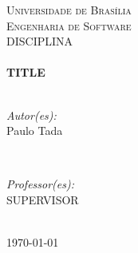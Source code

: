 \begin{titlepage}

\center %
 

\textsc{\LARGE Universidade de Brasília}\\[1.5cm]	%
\textsc{\Large Engenharia de Software}\\[0.5cm]		%
\textsc{\large DISCIPLINA}\\[0.5cm]		%


\HRule \\[0.4cm]
{ \huge \bfseries TITLE}\\[0.4cm] %
\HRule \\[1.5cm]
 

\begin{minipage}{0.4\textwidth}
\begin{flushleft} \large
\emph{Autor(es):}\\
Paulo Tada %
\end{flushleft}
\end{minipage}
~
\begin{minipage}{0.4\textwidth}
\begin{flushright} \large
\emph{Professor(es):} \\
SUPERVISOR %
\end{flushright}
\end{minipage}\\[4cm]


{\large \today}\\[3cm] %



\vfill %

\end{titlepage}
